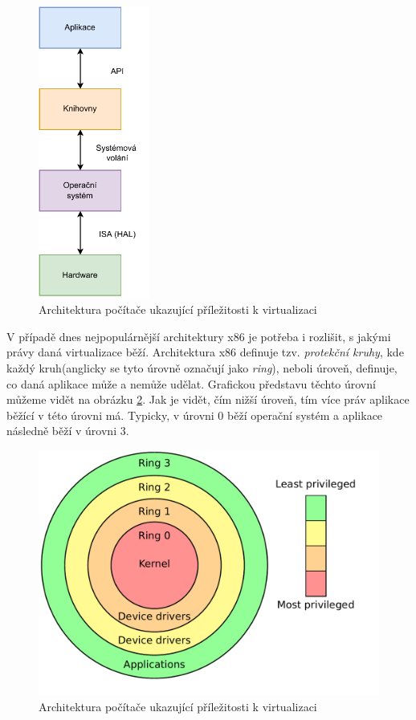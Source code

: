 \begin{figure}[htbp]
    \centering 
    \includegraphics[width=0.325\textwidth]{assets/img/computer_stack.pdf}
    \caption{Architektura počítače ukazující příležitosti k virtualizaci}
    \label{fig:pc_stack}
\end{figure}

V případě dnes nejpopulárnější architektury x86 je potřeba i rozlišit, s jakými právy daná virtualizace běží. Architektura x86 definuje tzv. \textit{protekční kruhy}, kde každý kruh(anglicky se tyto úrovně označují jako \textit{ring}), neboli úroveň, definuje, co daná aplikace může a nemůže udělat. Grafickou představu těchto úrovní můžeme vidět na obrázku \ref{fig:priv_rings}. Jak je vidět, čím nižší úroveň, tím více práv aplikace běžící v této úrovni má. Typicky, v úrovni 0 běží operační systém a aplikace následně běží v úrovni 3. \cite{RODRIGUEZHARO2012267}

\begin{figure}[htbp]
    \centering 
    \includegraphics[width=\textwidth]{assets/img/priv_rings.pdf}
    \caption{Architektura počítače ukazující příležitosti k virtualizaci}
    \label{fig:priv_rings}
\end{figure}


